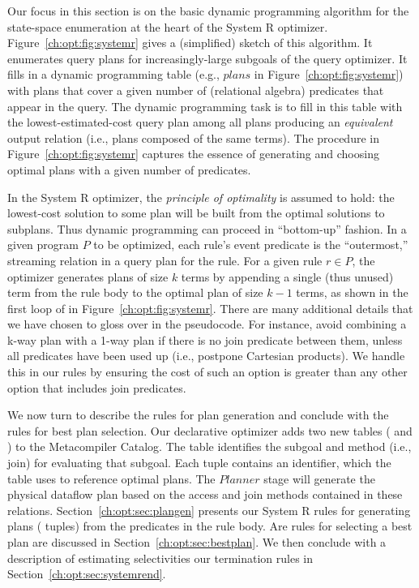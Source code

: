 Our focus in this section is on the basic dynamic programming algorithm for the
state-space enumeration at the heart of the System R optimizer.
Figure~\ref{ch:opt:fig:systemr} gives a (simplified) sketch of this
algorithm.  It enumerates query plans for increasingly-large subgoals of the
query optimizer.  It fills in a dynamic programming table (e.g., $plans$ in
Figure~\ref{ch:opt:fig:systemr}) with plans that cover a given number of
(relational algebra) predicates that appear in the query.  The dynamic
programming task is to fill in this table with the lowest-estimated-cost query
plan among all plans producing an {\em equivalent} output relation (i.e., plans
composed of the same terms).  The  procedure in
Figure~\ref{ch:opt:fig:systemr} captures the essence of generating and
choosing optimal plans with a given number of predicates.

In the System R optimizer, the {\em principle of optimality} is assumed to
hold: the lowest-cost solution to some plan will be built from the optimal
solutions to subplans.  Thus dynamic programming can proceed in ``bottom-up''
fashion.  In a given program $P$ to be optimized, each rule's event predicate
is the ``outermost,'' streaming relation in a query plan for the rule.  For a
given rule $r \in P$, the optimizer generates plans of size $k$ terms by
appending a single (thus unused) term from the rule body to the optimal plan of
size $k-1$ terms, as shown in the first loop of  in
Figure~\ref{ch:opt:fig:systemr}.  There are many additional details that we
have chosen to gloss over in the pseudocode.  For instance, avoid combining a
k-way plan with a 1-way plan if there is no join predicate between them, unless
all predicates have been used up (i.e., postpone Cartesian products).  We
handle this in our \OVERLOG rules by ensuring the cost of such an option is
greater than any other option that includes join predicates.  

We now turn to describe the \OVERLOG rules for plan generation and conclude
with the rules for best plan selection.  Our declarative optimizer adds two new
tables ( and ) to the Metacompiler Catalog.  The
 table identifies the subgoal and method (i.e., join) for evaluating
that subgoal.  Each  tuple contains an identifier, which the
 table uses to reference optimal plans.  The $Planner$ stage will
generate the physical dataflow plan based on the access and join methods
contained in these relations.  Section~\ref{ch:opt:sec:plangen} presents our
System R rules for generating plans ( tuples) from the predicates in
the rule body.  Are rules for selecting a best plan are discussed in
Section~\ref{ch:opt:sec:bestplan}.  We then conclude with a description of
estimating selectivities our termination rules in
Section~\ref{ch:opt:sec:systemrend}.

